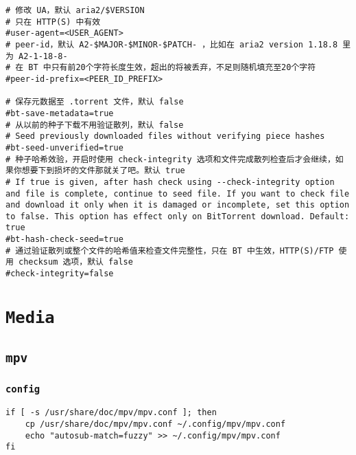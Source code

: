 \documentclass[11pt]{article}
\begin{document}
\begin{lstlisting}
# 修改 UA，默认 aria2/$VERSION
# 只在 HTTP(S) 中有效
#user-agent=<USER_AGENT>
# peer-id，默认 A2-$MAJOR-$MINOR-$PATCH- ，比如在 aria2 version 1.18.8 里为 A2-1-18-8-
# 在 BT 中只有前20个字符长度生效，超出的将被丢弃，不足则随机填充至20个字符
#peer-id-prefix=<PEER_ID_PREFIX>

# 保存元数据至 .torrent 文件，默认 false
#bt-save-metadata=true
# 从以前的种子下载不用验证散列，默认 false
# Seed previously downloaded files without verifying piece hashes
#bt-seed-unverified=true
# 种子哈希效验，开启时使用 check-integrity 选项和文件完成散列检查后才会继续，如果你想要下到损坏的文件那就关了吧。默认 true
# If true is given, after hash check using --check-integrity option and file is complete, continue to seed file. If you want to check file and download it only when it is damaged or incomplete, set this option to false. This option has effect only on BitTorrent download. Default: true
#bt-hash-check-seed=true
# 通过验证散列或整个文件的哈希值来检查文件完整性，只在 BT 中生效，HTTP(S)/FTP 使用 checksum 选项，默认 false
#check-integrity=false
\end{lstlisting}

\section{\texttt{Media}}
\label{sec:org94d266c}

\subsection{\texttt{mpv}}
\label{sec:org4e545cb}

\subsubsection{\texttt{config}}
\label{sec:org8ef30f0}

\lstset{language=bash,label= ,caption= ,captionpos=b,numbers=none}
\begin{lstlisting}
if [ -s /usr/share/doc/mpv/mpv.conf ]; then
    cp /usr/share/doc/mpv/mpv.conf ~/.config/mpv/mpv.conf
    echo "autosub-match=fuzzy" >> ~/.config/mpv/mpv.conf
fi
\end{lstlisting}
\end{document}
